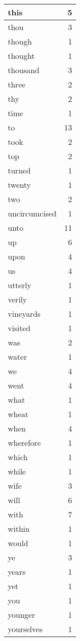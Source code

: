 \begin{center}
\begin{longtable}{l|r}
this & 5\\ \hline 
thou & 3\\ \hline 
though & 1\\ \hline 
thought & 1\\ \hline 
thousand & 3\\ \hline 
three & 2\\ \hline 
thy & 2\\ \hline 
time & 1\\ \hline 
to & 13\\ \hline 
took & 2\\ \hline 
top & 2\\ \hline 
turned & 1\\ \hline 
twenty & 1\\ \hline 
two & 2\\ \hline 
uncircumcised & 1\\ \hline 
unto & 11\\ \hline 
up & 6\\ \hline 
upon & 4\\ \hline 
us & 4\\ \hline 
utterly & 1\\ \hline 
verily & 1\\ \hline 
vineyards & 1\\ \hline 
visited & 1\\ \hline 
was & 2\\ \hline 
water & 1\\ \hline 
we & 4\\ \hline 
went & 4\\ \hline 
what & 1\\ \hline 
wheat & 1\\ \hline 
when & 4\\ \hline 
wherefore & 1\\ \hline 
which & 1\\ \hline 
while & 1\\ \hline 
wife & 3\\ \hline 
will & 6\\ \hline 
with & 7\\ \hline 
within & 1\\ \hline 
would & 1\\ \hline 
ye & 3\\ \hline 
years & 1\\ \hline 
yet & 1\\ \hline 
you & 1\\ \hline 
younger & 1\\ \hline 
yourselves & 1\\ \hline 
\end{longtable}
\end{center}



